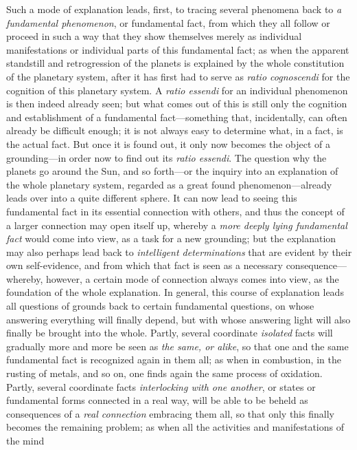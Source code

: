 \documentclass[12pt,a4paper]{book}
\begin{document}
Such a mode of explanation leads, first, to tracing several phenomena back to
\emph{a fundamental phenomenon}, or fundamental fact, from which they all follow or
proceed in such a way that they show themselves merely as individual manifestations
or individual parts of this fundamental fact; as when the apparent standstill and
retrogression of the planets is explained by the whole constitution of the planetary
system, after it has first had to serve as \textit{ratio cognoscendi} for the
cognition of this planetary system. A \textit{ratio essendi} for an individual
phenomenon is then indeed already seen; but what comes out of this is still only the
cognition and establishment of a fundamental fact---something that, incidentally,
can often already be difficult enough; it is not always easy to determine
what, in a fact, is the actual fact. But once it is found out, it only now becomes
the object of a grounding---in order now to find out its \textit{ratio essendi}. The
question why the planets go around the Sun, and so forth---or the inquiry into an
explanation of the whole planetary system, regarded as a great found
phenomenon---already leads over into a quite different sphere. It can now lead to
seeing this fundamental fact in its essential connection with others, and thus the
concept of a larger connection may open itself up, whereby a \emph{more deeply lying
fundamental fact} would come into view, as a task for a new grounding; but the
explanation may also perhaps lead back to \emph{intelligent determinations} that are
evident by their own self-evidence, and from which that fact is seen as a necessary
consequence---whereby, however, a certain mode of connection always comes into view,
as the foundation of the whole explanation. In general, this course of explanation
leads all questions of grounds back to certain fundamental questions, on whose
answering everything will finally depend, but with whose answering light will also
finally be brought into the whole. Partly, several coordinate \emph{isolated} facts
will gradually more and more be seen as \emph{the same, or alike}, so that one and
the same fundamental fact is recognized again in them all; as when in combustion, in
the rusting of metals, and so on, one finds again the same process of oxidation.
Partly, several coordinate facts \emph{interlocking with one another}, or states or
fundamental forms connected in a real way, will be able to be beheld as consequences
of a \emph{real connection} embracing them all, so that only this finally becomes
the remaining problem; as when all the activities and manifestations of the mind
\end{document}
